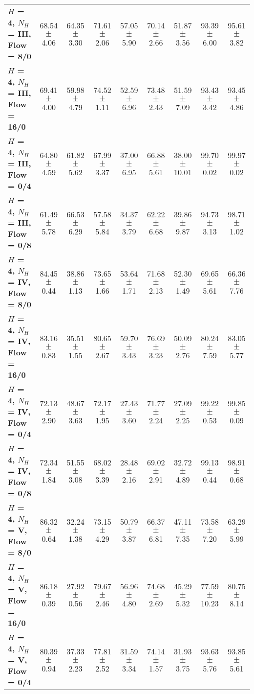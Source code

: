 \begin{table*}[ht]
{\begin{tabular}{lcccccccc}
        \midrule
        \textbf{$H$ = 4, $N_H$ = III, Flow = 8/0} & 68.54 $\pm$ 4.06 & 64.35 $\pm$ 3.30 & 71.61 $\pm$ 2.06 & 57.05 $\pm$ 5.90 & 70.14 $\pm$ 2.66 & 51.87 $\pm$ 3.56 & 93.39 $\pm$ 6.00 & 95.61 $\pm$ 3.82 \\
        \textbf{$H$ = 4, $N_H$ = III, Flow = 16/0} & 69.41 $\pm$ 4.00 & 59.98 $\pm$ 4.79 & 74.52 $\pm$ 1.11 & 52.59 $\pm$ 6.96 & 73.48 $\pm$ 2.43 & 51.59 $\pm$ 7.09 & 93.43 $\pm$ 3.42 & 93.45 $\pm$ 4.86 \\
        \textbf{$H$ = 4, $N_H$ = III, Flow = 0/4} & 64.80 $\pm$ 4.59 & 61.82 $\pm$ 5.62 & 67.99 $\pm$ 3.37 & 37.00 $\pm$ 6.95 & 66.88 $\pm$ 5.61 & 38.00 $\pm$ 10.01 & 99.70 $\pm$ 0.02 & 99.97 $\pm$ 0.02 \\
        \textbf{$H$ = 4, $N_H$ = III, Flow = 0/8} & 61.49 $\pm$ 5.78 & 66.53 $\pm$ 6.29 & 57.58 $\pm$ 5.84 & 34.37 $\pm$ 3.79 & 62.22 $\pm$ 6.68 & 39.86 $\pm$ 9.87 & 94.73 $\pm$ 3.13 & 98.71 $\pm$ 1.02 \\
        \midrule
        \textbf{$H$ = 4, $N_H$ = IV, Flow = 8/0} & 84.45 $\pm$ 0.44 & 38.86 $\pm$ 1.13 & 73.65 $\pm$ 1.66 & 53.64 $\pm$ 1.71 & 71.68 $\pm$ 2.13 & 52.30 $\pm$ 1.49 & 69.65 $\pm$ 5.61 & 66.36 $\pm$ 7.76 \\
        \textbf{$H$ = 4, $N_H$ = IV, Flow = 16/0} & 83.16 $\pm$ 0.83 & 35.51 $\pm$ 1.55 & 80.65 $\pm$ 2.67 & 59.70 $\pm$ 3.43 & 76.69 $\pm$ 3.23 & 50.09 $\pm$ 2.76 & 80.24 $\pm$ 7.59 & 83.05 $\pm$ 5.77 \\
        \textbf{$H$ = 4, $N_H$ = IV, Flow = 0/4} & 72.13 $\pm$ 2.90 & 48.67 $\pm$ 3.63 & 72.17 $\pm$ 1.95 & 27.43 $\pm$ 3.60 & 71.77 $\pm$ 2.24 & 27.09 $\pm$ 2.25 & 99.22 $\pm$ 0.53 & 99.85 $\pm$ 0.09 \\
        \textbf{$H$ = 4, $N_H$ = IV, Flow = 0/8} & 72.34 $\pm$ 1.84 & 51.55 $\pm$ 3.08 & 68.02 $\pm$ 3.39 & 28.48 $\pm$ 2.16 & 69.02 $\pm$ 2.91 & 32.72 $\pm$ 4.89 & 99.13 $\pm$ 0.44 & 98.91 $\pm$ 0.68 \\
        \midrule
        \textbf{$H$ = 4, $N_H$ = V, Flow = 8/0} & 86.32 $\pm$ 0.64 & 32.24 $\pm$ 1.38 & 73.15 $\pm$ 4.29 & 50.79 $\pm$ 3.87 & 66.37 $\pm$ 6.81 & 47.11 $\pm$ 7.35 & 73.58 $\pm$ 7.20 & 63.29 $\pm$ 5.99 \\
        \textbf{$H$ = 4, $N_H$ = V, Flow = 16/0} & 86.18 $\pm$ 0.39 & 27.92 $\pm$ 0.56 & 79.67 $\pm$ 2.46 & 56.96 $\pm$ 4.80 & 74.68 $\pm$ 2.69 & 45.29 $\pm$ 5.32 & 77.59 $\pm$ 10.23 & 80.75 $\pm$ 8.14 \\
        \textbf{$H$ = 4, $N_H$ = V, Flow = 0/4} & 80.39 $\pm$ 0.94 & 37.33 $\pm$ 2.23 & 77.81 $\pm$ 2.52 & 31.59 $\pm$ 3.34 & 74.14 $\pm$ 1.57 & 31.93 $\pm$ 3.75 & 93.63 $\pm$ 5.76 & 93.85 $\pm$ 5.61 \\

\end{tabular}}
\end{table*}

